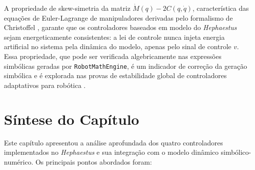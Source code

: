 A propriedade de skew-simetria da matriz $\dot{M}(q) - 2C(q,\dot{q})$, característica das equações de Euler-Lagrange de manipuladores derivadas pelo formalismo de Christoffel \cite{spong2020robot, siciliano2009robotics}, garante que os controladores baseados em modelo do \textit{Hephaestus} sejam energeticamente consistentes: a lei de controle nunca injeta energia artificial no sistema pela dinâmica do modelo, apenas pelo sinal de controle $v$. Essa propriedade, que pode ser verificada algebricamente nas expressões simbólicas geradas por \texttt{RobotMathEngine}, é um indicador de correção da geração simbólica e é explorada nas provas de estabilidade global de controladores adaptativos para robótica \cite{slotine1987adaptive, tomei2002simple}.

\section{Síntese do Capítulo}

Este capítulo apresentou a análise aprofundada dos quatro controladores implementados no \textit{Hephaestus} e sua integração com o modelo dinâmico simbólico-numérico. Os principais pontos abordados foram:

